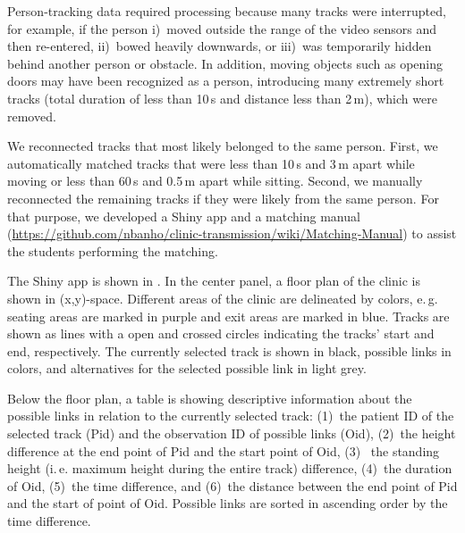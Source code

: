 \documentclass[fleqn,11pt]{wlscirep_supp}
\newcommand\ie{i.\,e.\xspace}
\newcommand\eg{e.\,g.\xspace}
\begin{document}
Person-tracking data required processing because many tracks were interrupted, for example, if the person i)~moved outside the range of the video sensors and then re-entered, ii)~bowed heavily downwards, or iii)~was temporarily hidden behind another person or obstacle. In addition, moving objects such as opening doors may have been recognized as a person, introducing many extremely short tracks (total duration of less than 10\,s and distance less than 2\,m), which were removed.

We reconnected tracks that most likely belonged to the same person. First, we automatically matched tracks that were less than 10\,s and 3\,m apart while moving or less than 60\,s and 0.5\,m apart while sitting. Second, we manually reconnected the remaining tracks if they were likely from the same person. For that purpose, we developed a Shiny app and a matching manual (\url{https://github.com/nbanho/clinic-transmission/wiki/Matching-Manual}) to assist the students performing the matching. 

The Shiny app is shown in . In the center panel, a floor plan of the clinic is shown in (x,y)-space. Different areas of the clinic are delineated by colors, \eg seating areas are marked in purple and exit areas are marked in blue. Tracks are shown as lines with a open and crossed circles indicating the tracks' start and end, respectively. The currently selected track is shown in black, possible links in colors, and alternatives for the selected possible link in light grey. 

Below the floor plan, a table is showing descriptive information about the possible links in relation to the currently selected track: (1)~the patient ID of the selected track (Pid) and the observation ID of possible links (Oid), (2)~the height difference at the end point of Pid and the start point of Oid, (3)~ the standing height (\ie maximum height during the entire track) difference, (4)~the duration of Oid, (5)~the time difference, and (6)~the distance between the end point of Pid and the start of point of Oid. Possible links are sorted in ascending order by the time difference. 
\end{document}
